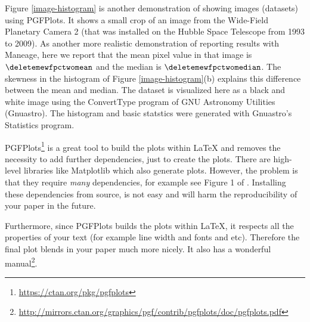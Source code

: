 \documentclass[10pt, twocolumn]{article}
\begin{document}
\begin{figure}[t]

\end{figure}

Figure \ref{image-histogram} is another demonstration of showing images
(datasets) using PGFPlots. It shows a small crop of an image from the
Wide-Field Planetary Camera 2 (that was installed on the Hubble Space
Telescope from 1993 to 2009). As another more realistic demonstration of
reporting results with Maneage, here we report that the mean pixel value in
that image is $\deletemewfpctwomean$ and the median is
$\deletemewfpctwomedian$. The skewness in the histogram of Figure
\ref{image-histogram}(b) explains this difference between the mean and
median. The dataset is visualized here as a black and white image using the
\textsf{Convert\-Type} program of GNU Astronomy Utilities (Gnuastro).  The
histogram and basic statstics were generated with Gnuastro's
\textsf{Statistics} program.

{\small PGFP}lots\footnote{\url{https://ctan.org/pkg/pgfplots}} is a great
tool to build the plots within \LaTeX{} and removes the necessity to add
further dependencies, just to create the plots. There are high-level
libraries like Matplotlib which also generate plots. However, the problem
is that they require \emph{many} dependencies, for example see Figure 1 of
\citet{alliez19}. Installing these dependencies from source, is not easy
and will harm the reproducibility of your paper in the future.

Furthermore, since {\small PGFP}lots builds the plots within \LaTeX{}, it
respects all the properties of your text (for example line width and fonts
and etc). Therefore the final plot blends in your paper much more
nicely. It also has a wonderful
manual\footnote{\url{http://mirrors.ctan.org/graphics/pgf/contrib/pgfplots/doc/pgfplots.pdf}}.

\begin{figure}[t]

\end{figure}
\end{document}
